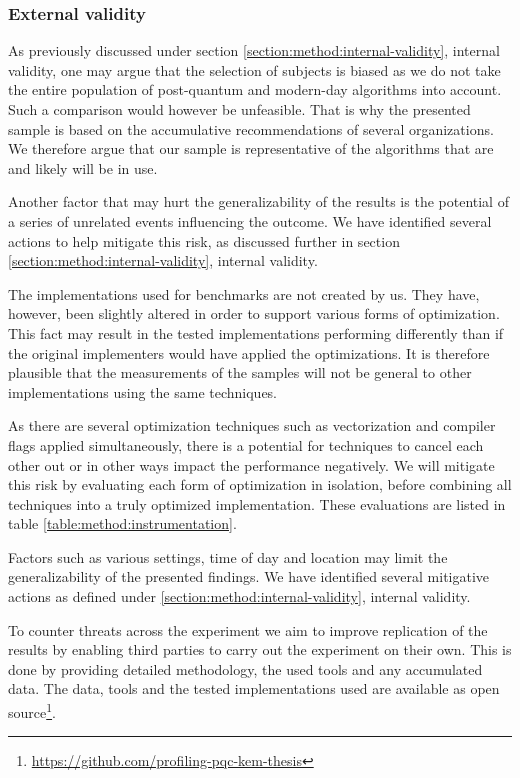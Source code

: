 \subsubsection{External validity}

As previously discussed under section \ref{section:method:internal-validity}, internal validity, one may argue that the selection of subjects is biased as we do not take the entire population of post-quantum and modern-day algorithms into account. Such a comparison would however be unfeasible. That is why the presented sample is based on the accumulative recommendations of several organizations. We therefore argue that our sample is representative of the algorithms that are and likely will be in use.

Another factor that may hurt the generalizability of the results is the potential of a series of unrelated events influencing the outcome. We have identified several actions to help mitigate this risk, as discussed further in section \ref{section:method:internal-validity}, internal validity.

The implementations used for benchmarks are not created by us. They have, however, been slightly altered in order to support various forms of optimization. This fact may result in the tested implementations performing differently than if the original implementers would have applied the optimizations. It is therefore plausible that the measurements of the samples will not be general to other implementations using the same techniques.

As there are several optimization techniques such as vectorization and compiler flags applied simultaneously, there is a potential for techniques to cancel each other out or in other ways impact the performance negatively. We will mitigate this risk by evaluating each form of optimization in isolation, before combining all techniques into a truly optimized implementation. These evaluations are listed in table \ref{table:method:instrumentation}.

Factors such as various settings, time of day and location may limit the generalizability of the presented findings. We have identified several mitigative actions as defined under \ref{section:method:internal-validity}, internal validity.

To counter threats across the experiment we aim to improve replication of the results by enabling third parties to carry out the experiment on their own. This is done by providing detailed methodology, the used tools and any accumulated data. The data, tools and the tested implementations used are available as open source\footnote{\href{https://github.com/profiling-pqc-kem-thesis}{https://github.com/profiling-pqc-kem-thesis}}.

